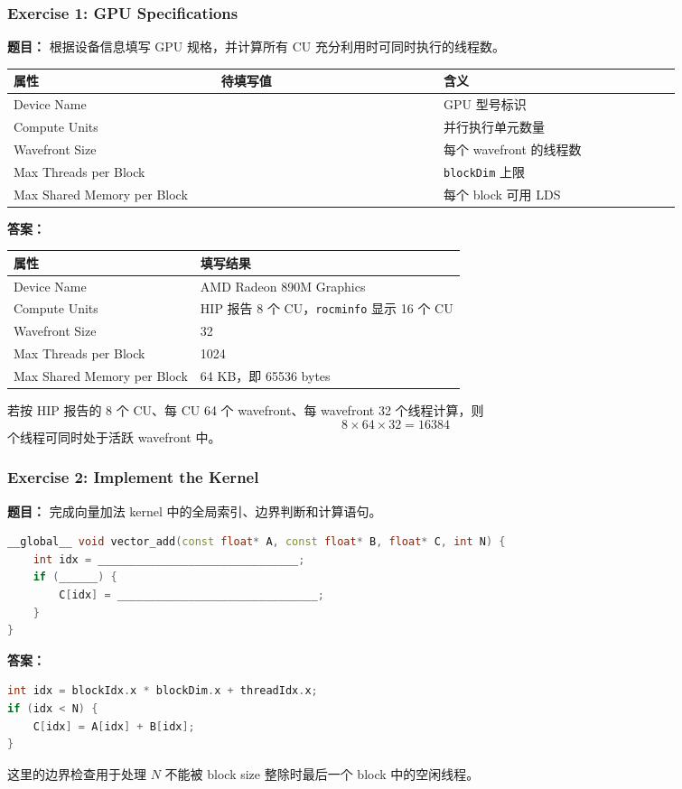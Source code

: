 \documentclass[10pt,a4paper]{article}
\begin{document}
\subsubsection{Exercise 1: GPU Specifications}
\noindent\textbf{题目：} 根据设备信息填写 GPU 规格，并计算所有 CU 充分利用时可同时执行的线程数。
\begin{center}
\small
\begin{tabular}{p{0.28\linewidth}p{0.30\linewidth}p{0.32\linewidth}}
\toprule
属性 & 待填写值 & 含义 \\
\midrule
Device Name & \underline{\hspace{6em}} & GPU 型号标识 \\
Compute Units & \underline{\hspace{6em}} & 并行执行单元数量 \\
Wavefront Size & \underline{\hspace{6em}} & 每个 wavefront 的线程数 \\
Max Threads per Block & \underline{\hspace{6em}} & \texttt{blockDim} 上限 \\
Max Shared Memory per Block & \underline{\hspace{6em}} & 每个 block 可用 LDS \\
\bottomrule
\end{tabular}
\end{center}
\noindent\textbf{答案：}
\begin{center}
\small
\begin{tabular}{ll}
\toprule
属性 & 填写结果 \\
\midrule
Device Name & AMD Radeon 890M Graphics \\
Compute Units & HIP 报告 8 个 CU，\texttt{rocminfo} 显示 16 个 CU \\
Wavefront Size & 32 \\
Max Threads per Block & 1024 \\
Max Shared Memory per Block & 64 KB，即 65536 bytes \\
\bottomrule
\end{tabular}
\end{center}
若按 HIP 报告的 8 个 CU、每 CU 64 个 wavefront、每 wavefront 32 个线程计算，则
\[
8\times64\times32=16384
\]
个线程可同时处于活跃 wavefront 中。

\subsubsection{Exercise 2: Implement the Kernel}
\noindent\textbf{题目：} 完成向量加法 kernel 中的全局索引、边界判断和计算语句。
\begin{lstlisting}[language=C++]
__global__ void vector_add(const float* A, const float* B, float* C, int N) {
    int idx = _______________________________;
    if (______) {
        C[idx] = _______________________________;
    }
}
\end{lstlisting}
\noindent\textbf{答案：}
\begin{lstlisting}[language=C++]
int idx = blockIdx.x * blockDim.x + threadIdx.x;
if (idx < N) {
    C[idx] = A[idx] + B[idx];
}
\end{lstlisting}
这里的边界检查用于处理 $N$ 不能被 block size 整除时最后一个 block 中的空闲线程。
\end{document}
